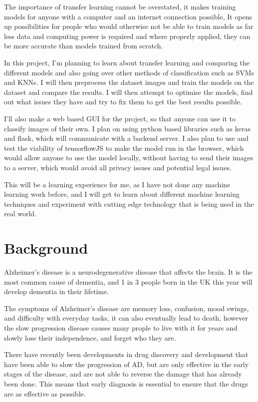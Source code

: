 \documentclass[]{final_report}
\begin{document}
The importance of transfer learning cannot be overstated, it makes training models for anyone with a computer and an internet connection possible, It opens up possibilities for people who would otherwise not be able to train models as far less data and computing power is required and where properly applied, they can be more accurate than models trained from scratch.

In this project, I'm planning to learn about transfer learning and comparing the different models and also going over other methods of classification such as SVMs and KNNs. I will then preprocess the dataset images and train the models on the dataset and compare the results. I will then attempt to optimise the models, find out what issues they have and try to fix them to get the best results possible.

I'll also make a web based GUI for the project, so that anyone can use it to classify images of their own. I plan on using python based libraries such as keras and flask, which will communicate with a backend server. I also plan to use and test the viability of tensorflowJS\cite{smilkov2019tensorflowjs} to make the model run in the browser, which would allow anyone to use the model locally, without having to send their images to a server, which would avoid all privacy issues and potential legal issues.

This will be a learning experience for me, as I have not done any machine learning work before, and I will get to learn about different machine learning techniques and experiment with cutting edge technology that is being used in the real world.

\section{Background}
Alzheimer's disease is a neurodegenerative disease that affects the brain. It is the most common cause of dementia, and 1 in 3 people born in the UK this year will develop dementia in their lifetime.\cite{DementiaStatistics}

The symptoms of Alzheimer's disease are memory loss, confusion, mood swings, and difficulty with everyday tasks, it can also eventually lead to death, however the slow progression disease causes many prople to live with it for years and slowly lose their independence, and forget who they are.

There have recently been developments in drug discovery and development that have been able to slow the progression of AD, but are only effective in the early stages of the disease, and are not able to reverse the damage that has already been done. This means that early diagnosis is essential to ensure that the drugs are as effective as possible.\cite{Van_Dyck2022-pt}
\end{document}
